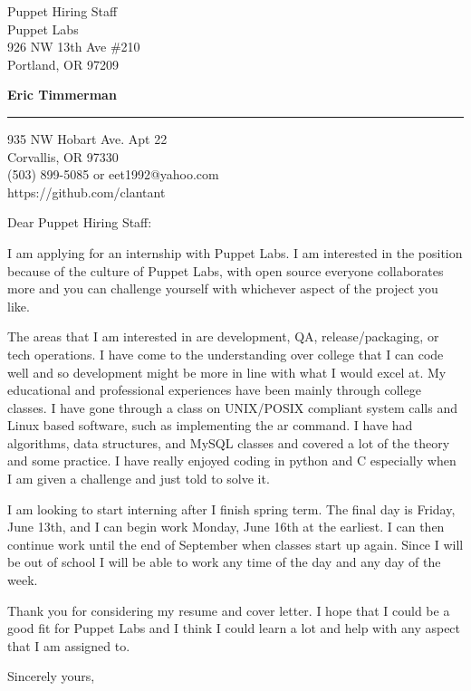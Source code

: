 \documentclass{letter} %
\begin{document}
\signature{Eric Timmerman}           %
\longindentation=0pt                       %
\let\raggedleft\raggedright                %
 
 
\begin{letter}{Puppet Hiring Staff\\
Puppet Labs\\
926 NW 13th Ave \#210\\
Portland, OR 97209}

\begin{center}
{\large\bf Eric Timmerman} 
\end{center}
\medskip\hrule height 1pt
\begin{center}
{935 NW Hobart Ave. Apt 22 \\   Corvallis, OR 97330 \\ (503) 899-5085 or eet1992@yahoo.com \\  https://github.com/clantant} 
\end{center} \vfill %
 
 
\opening{Dear Puppet Hiring Staff:} 
 
\noindent I am applying for an internship with Puppet Labs. I am interested in the position because of the culture of Puppet Labs, with open source everyone collaborates more and you can challenge yourself with whichever aspect of the project you like.
 
\noindent The areas that I am interested in are development, QA, release/packaging, or tech operations. I have come to the understanding over college that I can code well and so development might be more in line with what I would excel at. My educational and professional experiences have been mainly through college classes. I have gone through a class on UNIX/POSIX compliant system calls and Linux based software, such as implementing the ar command. I have had algorithms, data structures, and MySQL classes and covered a lot of the theory and some practice. I have really enjoyed coding in python and C especially when I am given a challenge and just told to solve it.

\noindent I am looking to start interning after I finish spring term. The final day is Friday, June 13th, and I can begin work Monday, June 16th at the earliest. I can then continue work until the end of September when classes start up again. Since I will be out of school I will be able to work any time of the day and any day of the week. 

\noindent Thank you for considering my resume and cover letter. I hope that I could be a good fit for Puppet Labs and I think I could learn a lot and help with any aspect that I am assigned to.
 
\closing{Sincerely yours,} 
 

 

\end{letter}
 
\end{document}
